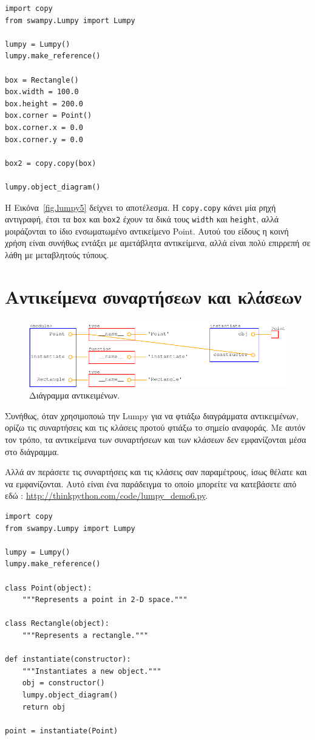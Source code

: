 \documentclass[10pt]{book}
\begin{document}
\begin{verbatim}
import copy
from swampy.Lumpy import Lumpy

lumpy = Lumpy()
lumpy.make_reference()

box = Rectangle()
box.width = 100.0
box.height = 200.0
box.corner = Point()
box.corner.x = 0.0
box.corner.y = 0.0

box2 = copy.copy(box)

lumpy.object_diagram()
\end{verbatim}

 Η Εικόνα~\ref{fig.lumpy5} δείχνει το αποτέλεσμα.  Η  {\tt copy.copy}  κάνει μία ρηχή αντιγραφή, έτσι τα  {\tt box}  και  {\tt box2}  έχουν 
τα δικά τους  {\tt width}  και  {\tt height},  αλλά μοιράζονται το ίδιο ενσωματωμένο αντικείμενο  Point.   Αυτού του είδους η κοινή χρήση είναι συνήθως εντάξει με αμετάβλητα αντικείμενα, αλλά είναι πολύ επιρρεπή σε λάθη με μεταβλητούς τύπους.

\section{Αντικείμενα συναρτήσεων και κλάσεων}

\begin{figure}
\centerline
{\includegraphics[scale=0.7]{figs/lumpydemo6.pdf}}
\caption{Διάγραμμα αντικειμένων.}
\label{fig.lumpy6}
\end{figure}

Συνήθως, όταν χρησιμοποιώ την  Lumpy  για να φτιάξω διαγράμματα αντικειμένων, ορίζω τις συναρτήσεις και τις κλάσεις προτού φτιάξω το σημείο αναφοράς.  Με αυτόν τον τρόπο, τα αντικείμενα των συναρτήσεων και των κλάσεων δεν εμφανίζονται μέσα στο διάγραμμα.

Αλλά αν περάσετε τις συναρτήσεις και τις κλάσεις σαν παραμέτρους, ίσως θέλατε και να εμφανίζονται.  Αυτό είναι ένα παράδειγμα το οποίο μπορείτε να κατεβάσετε από εδώ : \url{http://thinkpython.com/code/lumpy_demo6.py}. 

\begin{verbatim}
import copy
from swampy.Lumpy import Lumpy

lumpy = Lumpy()
lumpy.make_reference()

class Point(object):
    """Represents a point in 2-D space."""

class Rectangle(object):
    """Represents a rectangle."""

def instantiate(constructor):
    """Instantiates a new object."""
    obj = constructor()
    lumpy.object_diagram()
    return obj

point = instantiate(Point)
\end{verbatim}
\end{document}
